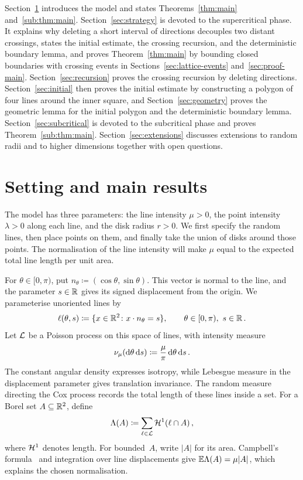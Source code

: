 \documentclass[11pt,letterpaper]{article}
\begin{document}
Section~\ref{sec:setting} introduces the model and states Theorems~\ref{thm:main} and~\ref{sub:thm:main}. Section~\ref{sec:strategy} is devoted to the supercritical phase. It explains why deleting a short interval of directions decouples two distant crossings, states the initial estimate, the crossing recursion, and the deterministic boundary lemma, and proves Theorem~\ref{thm:main} by bounding closed boundaries with crossing events in Sections~\ref{sec:lattice-events} and~\ref{sec:proof-main}. Section~\ref{sec:recursion} proves the crossing recursion by deleting directions. Section~\ref{sec:initial} then proves the initial estimate by constructing a polygon of four lines around the inner square, and Section~\ref{sec:geometry} proves the geometric lemma for the initial polygon and the deterministic boundary lemma. Section~\ref{sec:subcritical} is devoted to the subcritical phase and proves Theorem~\ref{sub:thm:main}. Section~\ref{sec:extensions} discusses extensions to random radii and to higher dimensions together with open questions.

\section{Setting and main results}
\label{sec:setting}

The model has three parameters: the line intensity $\mu>0$, the point intensity $\lambda>0$ along each line, and the disk radius $r>0$. We first specify the random lines, then place points on them, and finally take the union of disks around those points. The normalisation of the line intensity will make $\mu$ equal to the expected total line length per unit area.

For $\theta\in[0,\pi)$, put $n_\theta\coloneqq(\cos\theta,\sin\theta)$. This vector is normal to the line, and the parameter $s\in\mathbb R$ gives its signed displacement from the origin. We parameterise unoriented lines by
\begin{equation}\label{eq:line-parameters}
  \ell(\theta,s)\coloneqq\{x\in\mathbb R^2\colon x\cdot n_\theta=s\},\qquad\theta\in[0,\pi),\ s\in\mathbb R\,.
\end{equation}
Let $\mathcal L$ be a Poisson process on this space of lines, with intensity measure
\begin{equation}\label{eq:line-intensity}
  \nu_\mu(\mathrm{d}\theta\,\mathrm{d} s)\coloneqq\frac\mu\pi\,\mathrm{d}\theta\,\mathrm{d} s\,.
\end{equation}
The constant angular density expresses isotropy, while Lebesgue measure in the displacement parameter gives translation invariance. The random measure directing the Cox process records the total length of these lines inside a set. For a Borel set $A\subseteq\mathbb R^2$, define
\begin{equation}\label{eq:directing-measure}
  \Lambda(A)\coloneqq\sum_{\ell\in\mathcal L}\mathcal H^1(\ell\cap A)\,,
\end{equation}
where $\mathcal H^1$ denotes length. For bounded~$A$, write $\lvert A\rvert$ for its area. Campbell's formula~\cite[Proposition~2.7]{LP17} and integration over line displacements give $\mathbb E\Lambda(A)=\mu\lvert A\rvert$, which explains the chosen normalisation.
\end{document}

